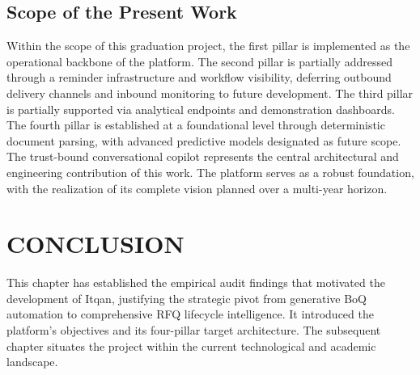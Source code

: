 \subsection{Scope of the Present Work}
Within the scope of this graduation project, the first pillar is implemented as the operational backbone of the platform. The second pillar is partially addressed through a reminder infrastructure and workflow visibility, deferring outbound delivery channels and inbound monitoring to future development. The third pillar is partially supported via analytical endpoints and demonstration dashboards. The fourth pillar is established at a foundational level through deterministic document parsing, with advanced predictive models designated as future scope. The trust-bound conversational copilot represents the central architectural and engineering contribution of this work. The platform serves as a robust foundation, with the realization of its complete vision planned over a multi-year horizon.

\section*{CONCLUSION}
This chapter has established the empirical audit findings that motivated the development of Itqan, justifying the strategic pivot from generative BoQ automation to comprehensive RFQ lifecycle intelligence. It introduced the platform's objectives and its four-pillar target architecture. The subsequent chapter situates the project within the current technological and academic landscape.
